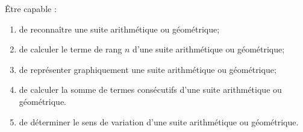 \begin{myobj}
	Être capable : 
\begin{enumerate}
	\item de reconnaître une suite arithmétique ou géométrique;
	\item de calculer le terme de rang $n$ d'une suite arithmétique ou géométrique;
	\item de représenter graphiquement une suite arithmétique ou géométrique;
	\item de calculer la somme de termes consécutifs d'une suite arithmétique ou géométrique.
	\item de déterminer le sens de variation d'une suite arithmétique ou géométrique.
\end{enumerate}
\end{myobj}